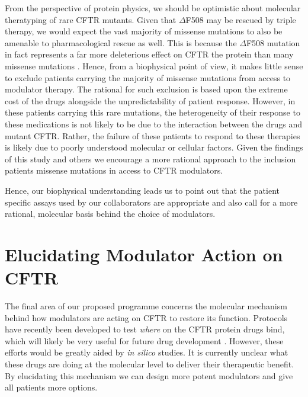 From the perspective of protein physics, we should be optimistic about molecular theratyping of rare CFTR mutants. Given that $\Delta$F508 may be rescued by triple therapy, we would expect the vast majority of missense mutations to also be amenable to pharmacological rescue as well. This is because the $\Delta$F508 mutation in fact represents a far more deleterious effect on CFTR the protein than many missense mutations \cite{bahia2021}. Hence, from a biophysical point of view, it makes little sense to exclude patients carrying the majority of missense mutations from access to modulator therapy. The rational for such exclusion is based upon the extreme cost of the drugs alongside the unpredictability of patient response. However, in these patients carrying this rare mutations, the heterogeneity of their response to these medications is not likely to be due to the interaction between the drugs and mutant CFTR. Rather, the failure of these patients to respond to these therapies is likely due to poorly understood molecular or cellular factors. Given the findings of this study and others we encourage a more rational approach to the inclusion patients missense mutations in access to CFTR modulators. 

Hence, our biophysical understanding leads us to point out that the patient specific assays used by our collaborators are appropriate and also call for a more rational, molecular basis behind the choice of modulators.  

\section{Elucidating Modulator Action on CFTR}

The final area of our proposed programme concerns the molecular mechanism behind how modulators are acting on CFTR to restore its function. Protocols have recently been developed to test \textit{where} on the CFTR protein drugs bind, which will likely be very useful for future drug development \cite{laselva2022}. However, these efforts would be greatly aided by \textit{in silico} studies. It is currently unclear what these drugs are doing at the molecular level to deliver their therapeutic benefit. By elucidating this mechanism we can design more potent modulators and give all patients more options. 


